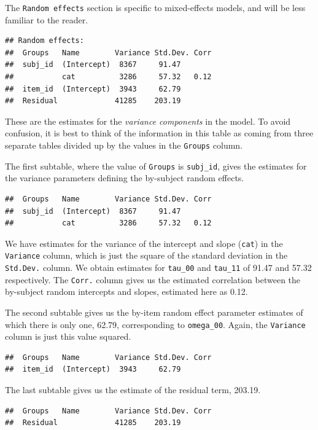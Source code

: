 \documentclass[doc,floatsintext]{apa6}
\begin{document}
The \texttt{Random\ effects} section is specific to mixed-effects
models, and will be less familiar to the reader.

\begin{verbatim}
## Random effects:
##  Groups   Name        Variance Std.Dev. Corr
##  subj_id  (Intercept)  8367     91.47       
##           cat          3286     57.32   0.12
##  item_id  (Intercept)  3943     62.79       
##  Residual             41285    203.19
\end{verbatim}

\noindent These are the estimates for the \emph{variance components} in
the model. To avoid confusion, it is best to think of the information in
this table as coming from three separate tables divided up by the values
in the \texttt{Groups} column.

The first subtable, where the value of \texttt{Groups} is
\texttt{subj\_id}, gives the estimates for the variance parameters
defining the by-subject random effects.

\begin{verbatim}
##  Groups   Name        Variance Std.Dev. Corr
##  subj_id  (Intercept)  8367     91.47       
##           cat          3286     57.32   0.12
\end{verbatim}

\noindent We have estimates for the variance of the intercept and slope
(\texttt{cat}) in the \texttt{Variance} column, which is just the square
of the standard deviation in the \texttt{Std.Dev.} column. We obtain
estimates for \texttt{tau\_00} and \texttt{tau\_11} of 91.47 and 57.32
respectively. The \texttt{Corr.} column gives us the estimated
correlation between the by-subject random intercepts and slopes,
estimated here as 0.12.

The second subtable gives us the by-item random effect parameter
estimates of which there is only one, 62.79, corresponding to
\texttt{omega\_00}. Again, the \texttt{Variance} column is just this
value squared.

\begin{verbatim}
##  Groups   Name        Variance Std.Dev. Corr
##  item_id  (Intercept)  3943     62.79
\end{verbatim}

The last subtable gives us the estimate of the residual term, 203.19.

\begin{verbatim}
##  Groups   Name        Variance Std.Dev. Corr
##  Residual             41285    203.19
\end{verbatim}
\end{document}
